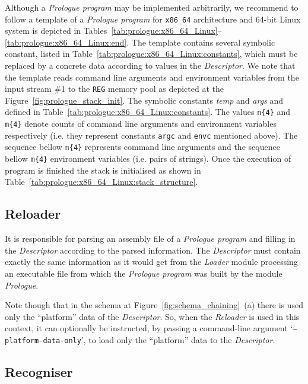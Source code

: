 \documentclass[10pt,twocolumn]{article}
\newcommand{\redtext}[1]{{\color{red}~{#1}~}}
\begin{document}
Although a \emph{Prologue program} may be implemented arbitrarily, we recommend
to follow a template of a \emph{Prologue program} for \texttt{x86\_64}
architecture and 64-bit Linux system is depicted in
Tables~\ref{tab:prologue:x86_64_Linux}--\ref{tab:prologue:x86_64_Linux:end}. The
template contains several symbolic constant, listed in
Table~\ref{tab:prologue:x86_64_Linux:constants}, which must be replaced by a
concrete data according to values in the \emph{Descriptor}. We note that the
template reads command line arguments and environment variables from the input
stream \#1 to the \texttt{REG} memory pool as depicted at the
Figure~\ref{fig:prologue_stack_init}. The symbolic constants \textit{temp} and
\textit{args} and defined in Table~\ref{tab:prologue:x86_64_Linux:constants}.
The values \texttt{n\{4\}} and \texttt{m\{4\}} denote counts of command line
arguments and environment variables respectively (i.e. they represent constants
\texttt{argc} and \texttt{envc} mentioned above). The sequence bellow
\texttt{n\{4\}} represents command line arguments and the sequence bellow
\texttt{m\{4\}} environment variables (i.e. pairs of strings). Once the
execution of program is finished the stack is initialised as shown in
Table~\ref{tab:prologue:x86_64_Linux:stack_structure}.



\subsection{Reloader}
\label{sec:MAL:reloader}

It is responsible for parsing an assembly file of a \emph{Prologue program} and
filling in the \emph{Descriptor} according to the parsed information. The
\emph{Descriptor} must contain exactly the same information as it would get from
the \emph{Loader} module processing an executable file from which the
\emph{Prologue program} was built by the module \emph{Prologue}.

Note though that in the schema at Figure~\ref{fig:schema_chaining}~(a) there is
used only the ``platform'' data of the \emph{Descriptor}. So, when the
\emph{Reloader} is used in this context, it can optionally be instructed, by
passing a command-line argument `\texttt{--platform-data-only}', to load only
the ``platform'' data to the \emph{Descriptor}.


\subsection{Recogniser}
\label{sec:MAL:recogniser}
\end{document}

